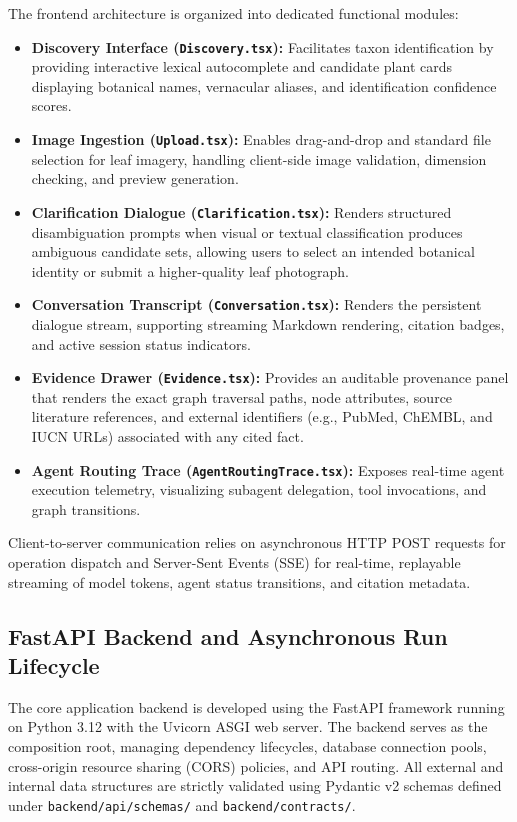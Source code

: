 The frontend architecture is organized into dedicated functional modules:
\begin{itemize}
    \item \textbf{Discovery Interface (\texttt{Discovery.tsx}):} Facilitates taxon identification by providing interactive lexical autocomplete and candidate plant cards displaying botanical names, vernacular aliases, and identification confidence scores.
    \item \textbf{Image Ingestion (\texttt{Upload.tsx}):} Enables drag-and-drop and standard file selection for leaf imagery, handling client-side image validation, dimension checking, and preview generation.
    \item \textbf{Clarification Dialogue (\texttt{Clarification.tsx}):} Renders structured disambiguation prompts when visual or textual classification produces ambiguous candidate sets, allowing users to select an intended botanical identity or submit a higher-quality leaf photograph.
    \item \textbf{Conversation Transcript (\texttt{Conversation.tsx}):} Renders the persistent dialogue stream, supporting streaming Markdown rendering, citation badges, and active session status indicators.
    \item \textbf{Evidence Drawer (\texttt{Evidence.tsx}):} Provides an auditable provenance panel that renders the exact graph traversal paths, node attributes, source literature references, and external identifiers (e.g., PubMed, ChEMBL, and IUCN URLs) associated with any cited fact.
    \item \textbf{Agent Routing Trace (\texttt{AgentRoutingTrace.tsx}):} Exposes real-time agent execution telemetry, visualizing subagent delegation, tool invocations, and graph transitions.
\end{itemize}

Client-to-server communication relies on asynchronous HTTP POST requests for operation dispatch and Server-Sent Events (SSE) for real-time, replayable streaming of model tokens, agent status transitions, and citation metadata.

\subsection{FastAPI Backend and Asynchronous Run Lifecycle}

The core application backend is developed using the FastAPI framework running on Python 3.12 with the Uvicorn ASGI web server. The backend serves as the composition root, managing dependency lifecycles, database connection pools, cross-origin resource sharing (CORS) policies, and API routing. All external and internal data structures are strictly validated using Pydantic v2 schemas defined under \texttt{backend/\allowbreak api/\allowbreak schemas/\allowbreak } and \texttt{backend/\allowbreak contracts/\allowbreak }.

